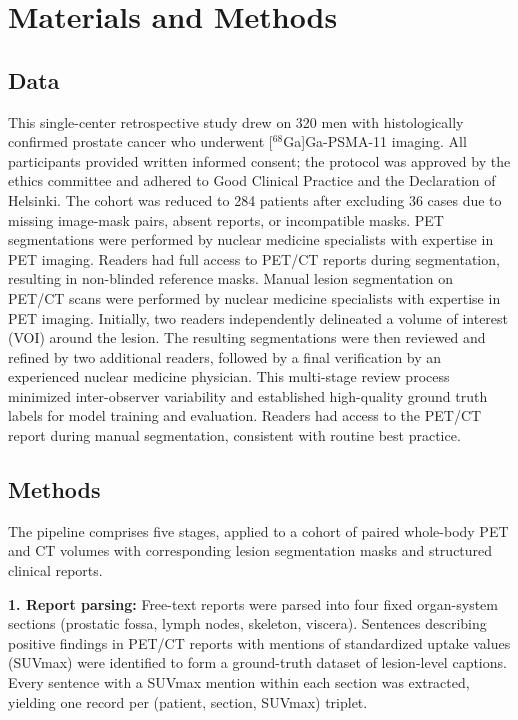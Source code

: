 \documentclass[10pt]{article}
\begin{document}
\section*{Materials and Methods}
\subsection*{Data}
This single-center retrospective study drew on 320 men with histologically confirmed prostate cancer who underwent [$^{68}$Ga]Ga-PSMA-11 imaging. All participants provided written informed consent; the protocol was approved by the ethics committee and adhered to Good Clinical Practice and the Declaration of Helsinki. The cohort was reduced to 284 patients after excluding 36 cases due to missing image-mask pairs, absent reports, or incompatible masks. PET segmentations were performed by nuclear medicine specialists with expertise in PET imaging. Readers had full access to PET/CT reports during segmentation, resulting in non-blinded reference masks. 
Manual lesion segmentation on PET/CT scans were performed by nuclear medicine specialists with expertise in PET imaging. Initially, two readers independently delineated a volume of interest (VOI) around the lesion. The resulting segmentations were then reviewed and refined by two additional readers, followed by a final verification by an experienced nuclear medicine physician. This multi-stage review process minimized inter-observer variability and established high-quality ground truth labels for model training and evaluation. Readers had access to the PET/CT report during manual segmentation, consistent with routine best practice.


\subsection*{Methods}
The pipeline comprises five stages, applied to a cohort of paired whole-body PET and CT volumes with corresponding lesion segmentation masks and structured clinical reports.


\textbf{1. Report parsing:}
Free-text reports were parsed into four fixed organ-system sections (prostatic fossa, lymph nodes, skeleton, viscera). Sentences describing positive findings in PET/CT reports with mentions of standardized uptake values (SUVmax) were identified to form a ground-truth dataset of lesion-level captions. Every sentence with a SUVmax mention within each section was extracted, yielding one record per (patient, section, SUVmax) triplet.
\end{document}
